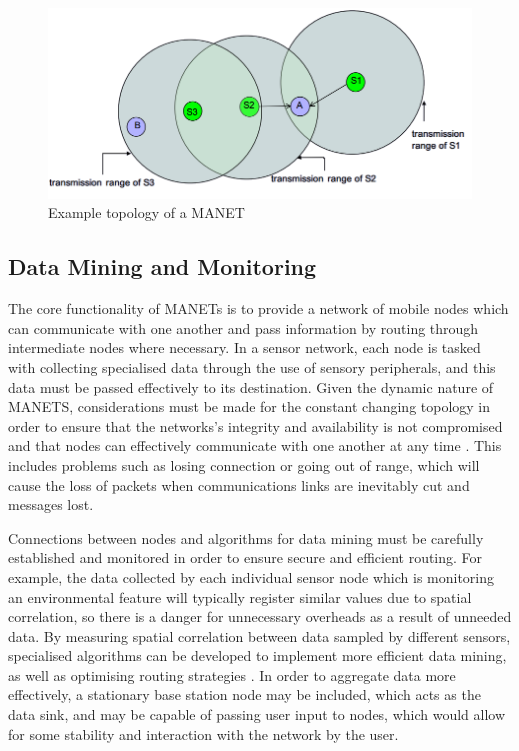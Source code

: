 \begin{figure}
\centering	
\includegraphics[scale=0.7]{img/manet}	
\caption{Example topology of a MANET}
\end{figure}

\subsection{Data Mining and Monitoring}
The core functionality of MANETs is to provide a network of mobile nodes which can communicate with one another and pass information by routing through intermediate nodes where necessary. In a sensor network, each node is tasked with collecting specialised data through the use of sensory peripherals, and this data must be passed effectively to its destination. Given the dynamic nature of MANETS, considerations must be made for the constant changing topology in order to ensure that the networks's integrity and availability is not compromised and that nodes can effectively communicate with one another at any time \cite{ramramathanjasonredi2012}. This includes problems such as losing connection or going out of range, which will cause the loss of packets when communications links are inevitably cut and messages lost. 

Connections between nodes and algorithms for data mining must be carefully established and monitored in order to ensure secure and efficient routing. For example, the data collected by each individual sensor node which is monitoring an environmental feature will typically register similar values due to spatial correlation, so there is a danger for unnecessary overheads as a result of unneeded data. By measuring spatial correlation between data sampled by different sensors, specialised algorithms can be developed to implement more efficient data mining, as well as optimising routing strategies \cite{mayajie2011}. In order to aggregate data more effectively, a  stationary base station node may be included, which acts as the data sink, and may be capable of passing user input to nodes, which would allow for some stability and interaction with the network by the user. 

